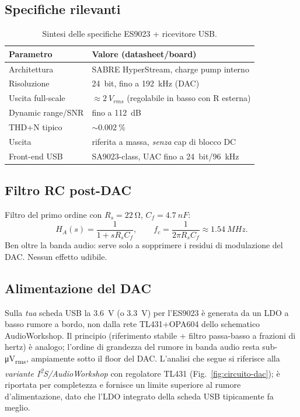 \subsection{Specifiche rilevanti}
\begin{table}[H]
  \centering
  \begin{tabular}{ll}
    \toprule
    Parametro & Valore (datasheet/board) \\
    \midrule
    Architettura      & SABRE HyperStream, charge pump interno \\
    Risoluzione        & \SI{24}{bit}, fino a \SI{192}{kHz} (DAC) \\
    Uscita full-scale  & $\approx\SI{2}{V_{rms}}$ (regolabile in basso con R esterna) \\
    Dynamic range/SNR  & fino a \SI{112}{dB} \\
    THD+N tipico       & $\sim\SI{0.002}{\%}$ \\
    Uscita             & riferita a massa, \emph{senza} cap di blocco DC \\
    Front-end USB      & SA9023-class, UAC fino a \SI{24}{bit}/\SI{96}{kHz} \\
    \bottomrule
  \end{tabular}
  \caption{Sintesi delle specifiche ES9023 + ricevitore USB.}
\end{table}

\subsection{Filtro RC post-DAC}
Filtro del primo ordine con $R_s=\SI{22}{\ohm}$, $C_f=\SI{4.7}{nF}$:
\begin{equation}
  H_A(s)=\frac{1}{1+sR_sC_f},\qquad
  f_c=\frac{1}{2\pi R_sC_f}\approx\SI{1.54}{MHz}.
\end{equation}
Ben oltre la banda audio: serve solo a sopprimere i residui di
modulazione del DAC. Nessun effetto udibile.

\subsection{Alimentazione del DAC}
Sulla \emph{tua} scheda USB la \SI{3.6}{V} (o \SI{3.3}{V}) per l'ES9023 è
generata da un LDO a basso rumore a bordo, non dalla rete TL431+OPA604
dello schematico AudioWorkshop. Il principio (riferimento stabile +
filtro passa-basso a frazioni di hertz) è analogo; l'ordine di grandezza
del rumore in banda audio resta sub-\si{\micro V_{rms}}, ampiamente sotto
il floor del DAC. L'analisi che segue si riferisce alla
\emph{variante I\textsuperscript{2}S/AudioWorkshop} con regolatore TL431
(Fig.~\ref{fig:circuito-dac}); è riportata per completezza e fornisce un
limite superiore al rumore d'alimentazione, dato che l'LDO integrato
della scheda USB tipicamente fa meglio.

